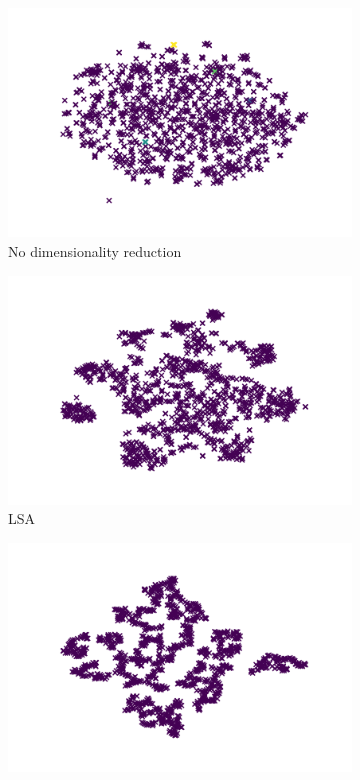 \begin{figure}
  \centering
  \begin{subfigure}{.3\textwidth}
      \centering
      \includegraphics[width=\linewidth]{imgs/dbscan.png}
      \caption{No dimensionality reduction}
      \label{fig:dbscan_no_dim}
  \end{subfigure}
  \begin{subfigure}{.3\textwidth}
    \centering
    \includegraphics[width=\linewidth]{imgs/dbscan_lsa.png}
    \caption{LSA}
    \label{fig:dbscan_lsa}
  \end{subfigure}%
  \begin{subfigure}{.3\textwidth}
    \centering
    \includegraphics[width=\linewidth]{imgs/dbscan_spectral.png}

\end{subfigure}
\end{figure}
